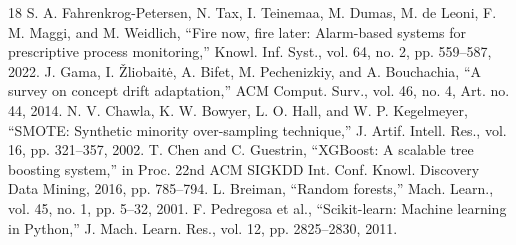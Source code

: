 \documentclass[conference]{IEEEtran}
\begin{document}
\begin{thebibliography}{18}
 S. A. Fahrenkrog-Petersen, N. Tax, I. Teinemaa, M. Dumas, M. de Leoni, F. M. Maggi, and M. Weidlich, ``Fire now, fire later: Alarm-based systems for prescriptive process monitoring,'' Knowl. Inf. Syst., vol. 64, no. 2, pp. 559--587, 2022.
 J. Gama, I. Žliobaitė, A. Bifet, M. Pechenizkiy, and A. Bouchachia, ``A survey on concept drift adaptation,'' ACM Comput. Surv., vol. 46, no. 4, Art. no. 44, 2014.
 N. V. Chawla, K. W. Bowyer, L. O. Hall, and W. P. Kegelmeyer, ``SMOTE: Synthetic minority over-sampling technique,'' J. Artif. Intell. Res., vol. 16, pp. 321--357, 2002.
 T. Chen and C. Guestrin, ``XGBoost: A scalable tree boosting system,'' in Proc. 22nd ACM SIGKDD Int. Conf. Knowl. Discovery Data Mining, 2016, pp. 785--794.
 L. Breiman, ``Random forests,'' Mach. Learn., vol. 45, no. 1, pp. 5--32, 2001.
 F. Pedregosa et al., ``Scikit-learn: Machine learning in Python,'' J. Mach. Learn. Res., vol. 12, pp. 2825--2830, 2011.
\end{thebibliography}
\end{document}
